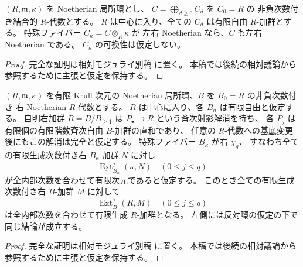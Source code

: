 \begin{lemma}
\label{lem:local-commutative-fibre-noetherian}
$(R,\mathfrak m,\kappa)$ を Noetherian 局所環とし、
$C=\bigoplus_{d\ge0}C_d$ を $C_0=R$ の
非負次数付き結合的 $R$-代数とする。
$R$ は中心に入り、全ての $C_d$ は有限自由 $R$-加群とする。
特殊ファイバー $C_\kappa=C\otimes_R\kappa$ が
左右 Noetherian なら、$C$ も左右 Noetherian である。
$C_\kappa$ の可換性は仮定しない。
\end{lemma}
\begin{proof}
完全な証明は相対モジュライ別稿
\cite[相対Koszul・Noetherian基底変更・tailsの節]{QuadricModuli2026} に置く。
本稿では後続の相対議論から参照するために主張と仮定を保持する。
\end{proof}




\begin{lemma}
\label{lem:local-chi-specialization}
$(R,\mathfrak m,\kappa)$ を有限 Krull 次元の
Noetherian 局所環、$B$ を $B_0=R$ の非負次数付き
右 Noetherian $R$-代数とする。
$R$ は中心に入り、各 $B_n$ は有限自由と仮定する。
自明右加群 $R=B/B_{\ge1}$ は
$P_\bullet\to R$ という斉次射影解消を持ち、
各 $P_j$ は有限個の有限階数斉次自由 $B$-加群の直和であり、
任意の $R$-代数への基底変更後にもこの解消は完全と仮定する。
特殊ファイバー $B_\kappa$ が右 $\chi_q$、
すなわち全ての有限生成次数付き右 $B_\kappa$-加群 $N$ に対し
\[
 \underline{\operatorname{Ext}}_{B_\kappa}^{j}(\kappa,N)
 \quad(0\le j\le q)
\]
が全内部次数を合わせて有限次元であると仮定する。
このとき全ての有限生成次数付き右 $B$-加群 $M$ に対して
\[
 \underline{\operatorname{Ext}}_B^j(R,M)
 \quad(0\le j\le q)
\]
は全内部次数を合わせて有限生成 $R$-加群となる。
左側には反対環の仮定の下で同じ結論が成立する。
\end{lemma}
\begin{proof}
完全な証明は相対モジュライ別稿
\cite[相対Koszul・Noetherian基底変更・tailsの節]{QuadricModuli2026} に置く。
本稿では後続の相対議論から参照するために主張と仮定を保持する。
\end{proof}



